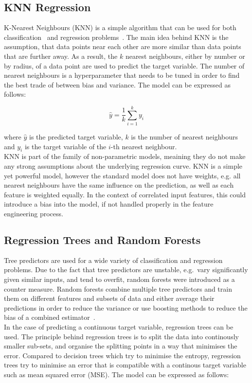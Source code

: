 \subsection{KNN Regression}

K-Nearest Neighbours (KNN) is a simple algorithm that can be used for both classification~\cite{cover1967nearest} and regression problems~\cite{altman1992introduction}. The main idea behind KNN is the assumption, that data points near each other are more similar than data points that are further away. As a result, the $k$ nearest neighbours, either by number or by radius, of a data point are used to predict the target variable. The number of nearest neighbours is a hyperparameter that needs to be tuned in order to find the best trade of between bias and variance. The model can be expressed as follows:

\begin{equation}
    \hat{y} = \frac{1}{k} \sum_{i=1}^{k} y_i
\end{equation}

where $\hat{y}$ is the predicted target variable, $k$ is the number of nearest neighbours and $y_i$ is the target variable of the $i$-th nearest neighbour.\\
KNN is part of the family of non-parametric models, meaining they do not make any strong assumptions about the underlying regression curve. KNN is a simple yet powerful model, however the standard model does not have weights, e.g. all nearest neighbours have the same influence on the prediction, as well as each feature is weighted equally. In the context of correlated input features, this could introduce a bias into the model, if not handled properly in the feature engineering process.


\subsection{Regression Trees and Random Forests}

Tree predictors are used for a wide variety of classification and regression problems. Due to the fact that tree predictors are unstable, e.g.\ vary significantly given similar inputs, and tend to overfit, random forests were introduced as a counter measure. Random forests combine multiple tree predictors and train them on different features and subsets of data and either average their predictions in order to reduce the variance or use boosting methods to reduce the bias of a combined estimator~\cite{breiman2001random}.\\
In the case of predicting a continuous target variable, regression trees can be used. The principle behind regression trees is to split the data into continously smaller sub-sets, and organise the splitting points in a way that minimises the error. Compared to decision trees which try to minimise the entropy, regression trees try to minimise an error that is compatible with a continous target variable such as mean squared error (MSE). The model can be expressed as follows:

